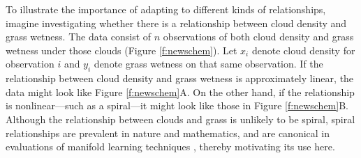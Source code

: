 \documentclass[11pt]{article}
\begin{document}


To illustrate the importance of adapting to different kinds of relationships, 
imagine investigating whether there is a relationship between cloud density and grass wetness. The data consist of $n$ observations of both cloud density and grass wetness under those clouds (Figure \ref{f:newschem}).
Let $x_i$ denote cloud density for observation $i$ and $y_i$ denote grass wetness on that same observation. 
If the relationship between cloud density and grass wetness is approximately linear, the data might look like Figure \ref{f:newschem}{\color{magenta}A}. 
On the other hand, if the relationship is nonlinear---such as a  spiral---it might look like those in Figure \ref{f:newschem}{\color{magenta}B}.
Although the relationship between clouds and grass is unlikely to be spiral, spiral relationships are prevalent in nature and mathematics, and are canonical in evaluations of manifold learning techniques \cite{Lee07a}, thereby motivating its use here.
\end{document}
